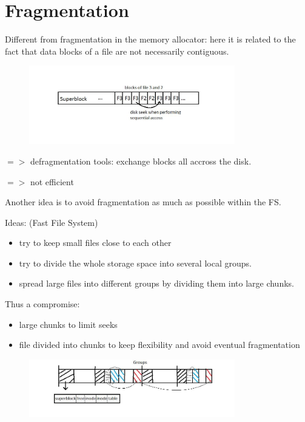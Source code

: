 \section{Fragmentation}

Different from fragmentation in the memory allocator: here it is related to the fact that data blocks of a file are not necessarily contiguous.

 \begin{figure}[h!]
  \begin{center}
    \includegraphics[width=0.8\textwidth]{fragmentation.jpg}
  \end{center}
\end{figure}

$=>$ defragmentation tools: exchange blocks all accross the disk.

$=>$ not efficient

Another idea is to avoid fragmentation as much as possible within the FS.

Ideas: (Fast File System)
\begin{itemize}
  \item  try to keep small files close to each other
  \item try to divide the whole storage space into several local groups.
  \item spread large files into different groups by dividing them into large chunks.
\end{itemize}

Thus a compromise:
\begin{itemize}
  \item large chunks to limit seeks
  \item file divided into chunks to keep flexibility and avoid eventual fragmentation
\end{itemize}

\begin{figure}[h!]
  \begin{center}
    \includegraphics[width=0.8\textwidth]{fragmentation_2.jpg}
  \end{center}
\end{figure}

